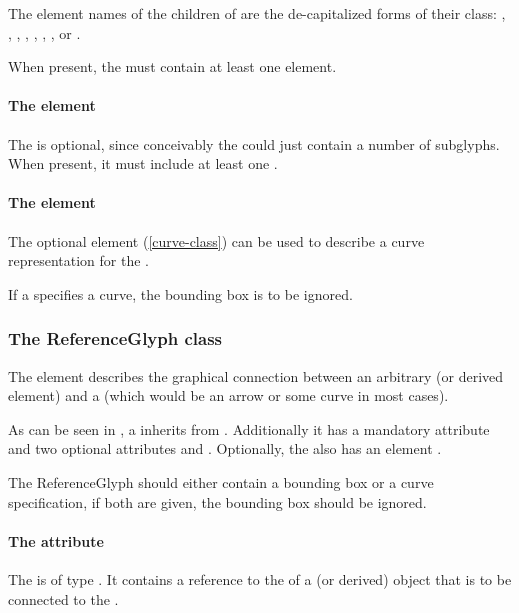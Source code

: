 The element names of the children of \ListOfSubGlyphs are the de-capitalized
forms of their class: , ,
, , ,
, , or .

When present, the  must contain at least one element. 

\paragraph {The  element}
\label{listofreferenceglyphs-class}
The \ListOfReferenceGlyphs is optional, since conceivably the 
\GeneralGlyph could just contain a number of subglyphs. When present, 
it must include at least one \ReferenceGlyph. 


\paragraph {The  element}
The optional \Curve element (\ref{curve-class}) can be used to describe 
a curve representation for the \GeneralGlyph. 

If a \GeneralGlyph specifies a curve, the bounding box is to be ignored. 

\subsubsection{The ReferenceGlyph class}
\label{referenceglyph-class}
The  element describes the graphical connection 
between an arbitrary \GraphicalObject (or derived element) and a 
\GeneralGlyph (which would be an arrow or some curve in most cases). 

As can be seen in , a \ReferenceGlyph 
inherits from \GraphicalObject. Additionally it has a mandatory 
attribute  and two optional attributes  
and . Optionally, the \ReferenceGlyph also has an element 
. 

The ReferenceGlyph should either contain a bounding box or a curve 
specification, if both are given, the bounding box should be ignored. 

\paragraph{The  attribute}
The  is of type . It contains a reference 
to the  of a \GraphicalObject (or derived) object that is to 
be connected to the \GeneralGlyph. 


